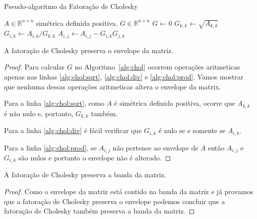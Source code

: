 \begin{algorithm}[H]
    \caption{Pseudo-algoritmo da Fatoração de Cholesky}
    \label{alg:chol}
    \begin{algorithmic}[1]
        \REQUIRE $A \in \mathbb{R}^{n \times n}$ simétrica definida positiva.
        \ENSURE $G \in \mathbb{R}^{n \times n}$
        \STATE $G \longleftarrow 0$ 
            \STATE $G_{k,k} \longleftarrow \sqrt{A_{k,k}}$ \label{alg:chol:sqrt}
                \STATE $G_{i,k} \longleftarrow A_{i,k} / G_{k,k}$
                \label{alg:chol:div}
            \ENDFOR
                    \STATE $A_{i,j} \longleftarrow A_{i,j} - G_{i,k} G_{j,k}$
                    \label{alg:chol:prod}
                \ENDFOR
            \ENDFOR
        \ENDFOR
    \end{algorithmic}
\end{algorithm}

\begin{prop}
    \label{prop:pres:env}
    A fatoração de Cholesky preserva o envelope da matriz.
\end{prop}
\begin{proof}
    Para calcular $G$ no Algoritmo~\ref{alg:chol} ocorrem operações aritmeticas
    apenas nas linhas \ref{alg:chol:sqrt}, \ref{alg:chol:div} e
    \ref{alg:chol:prod}. Vamos mostrar que nenhuma dessas operações aritmeticas
    altera o envelope da matrix.

    Para a linha \ref{alg:chol:sqrt}, como $A$ é simétrica definida positiva,
    ocorre que $A_{k,k}$ é não nulo e, portanto, $G_{k,k}$ também.

    Para a linha \ref{alg:chol:div} é fácil verificar que $G_{i,k}$ é nulo se e
    somente se $A_{i,k}$.

    Para a linha \ref{alg:chol:prod}, se $A_{i,j}$ não pertence ao envelope de $A$
    então $A_{i,j}$ e $G_{i,k}$ são nulos e portanto o envelope não é alterado.
\end{proof}

\begin{prop}
    \label{prop:pres:band}
    A fatoração de Cholesky preserva a banda da matriz.
\end{prop}
\begin{proof}
    Como o envelope da matriz está contido na banda da matriz e já provamos que
    a fatoração de Cholesky preserva o envelope podemos concluir que a fatoração
    de Cholesky também preserva a banda da matriz.
\end{proof}

